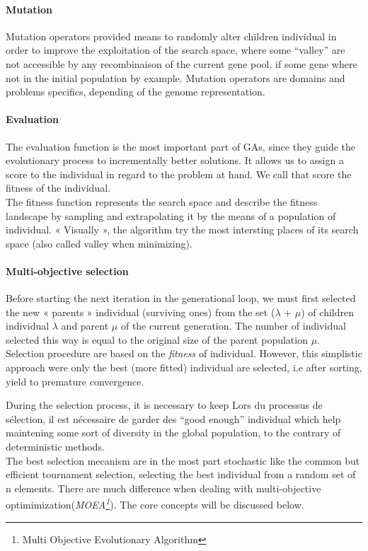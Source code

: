 \documentclass[12pt]{memoir}
\begin{document}
\paragraph{Mutation} %
\label{par:Mutation}
Mutation operators provided means to randomly alter children  individual in order to improve the exploitation of the search space, where some “valley” are not accessible by any recombinaison of the current gene pool, if some gene where not in the initial population by example.
Mutation operators are domains and problems specifics, depending of the genome representation.

\paragraph{Evaluation} %
\label{par:Evaluation}
The evaluation function is the most important part of GAs, since they guide the evolutionary process to incrementally better solutions. It allows us to assign a score to the individual in regard to the problem at hand. We call that score the fitness of the individual. \\
The fitness function represents the search space and describe the fitness landscape by sampling and extrapolating it by the means of a population of individual. « Visually », the algorithm try the most intersting places of its search space (also called valley when minimizing).


\paragraph{Multi-objective selection } %
Before starting the next iteration in the generational loop, we must first selected the new « parents
» individual (surviving ones) from the set ($\lambda$ + $\mu$) of children individual $\lambda$ and parent $\mu$ of the current generation. The number of individual selected this way is equal to the original size of the parent population  $\mu$. \\
Selection procedure are based on the \emph{fitness} of individual. However, this simplistic approach were only the best (more fitted) individual are selected, i.e after sorting, yield to premature convergence.


\bigskip
During the selection process, it is necessary to keep  
Lors du processus de sélection, il est nécessaire de garder des ``good enough\cite{sharma2010archived,deb2002fast}'' individual which help maintening some sort of diversity in the global population, to the contrary of deterministic methods. \\
The best selection mecanism are in the most part stochastic like the common but efficient tournament selection, selecting the best individual from a random set of n elements. 
There are much difference when dealing with multi-objective optimimization(\emph{MOEA\footnote{Multi Objective Evolutionary Algorithm}}). The core concepts will be discussed below.
\end{document}
